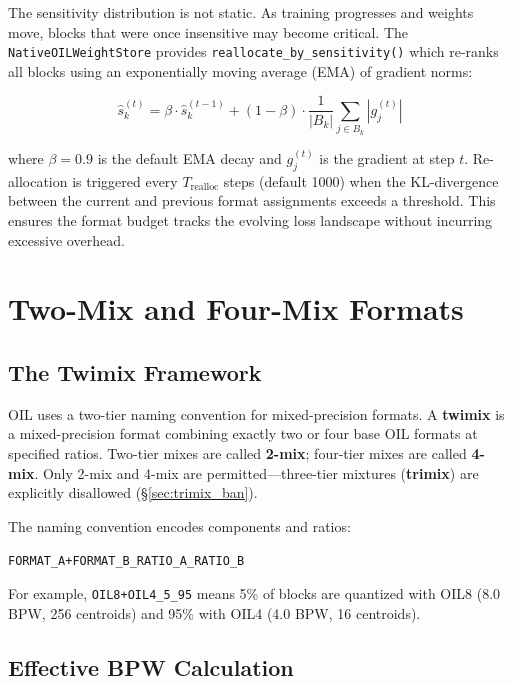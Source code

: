The sensitivity distribution is not static.  As training progresses and
weights move, blocks that were once insensitive may become critical.
The \texttt{NativeOILWeightStore} provides
\texttt{reallocate\_by\_sensitivity()} which re-ranks all blocks using
an exponentially moving average (EMA) of gradient norms:

\begin{equation}
\hat{s}_k^{(t)} = \beta \cdot \hat{s}_k^{(t-1)} + (1 - \beta) \cdot
  \frac{1}{|B_k|} \sum_{j \in B_k} |g_j^{(t)}|
\label{eq:ema_sensitivity}
\end{equation}

\noindent where $\beta = 0.9$ is the default EMA decay and
$g_j^{(t)}$ is the gradient at step $t$.  Re-allocation is triggered
every $T_{\text{realloc}}$ steps (default 1000) when the KL-divergence
between the current and previous format assignments exceeds a threshold.
This ensures the format budget tracks the evolving loss landscape without
incurring excessive overhead.

\section{Two-Mix and Four-Mix Formats}
\label{sec:twimix}

\subsection{The Twimix Framework}

OIL uses a two-tier naming convention for mixed-precision formats.  A
\textbf{twimix} is a mixed-precision format combining exactly two or four
base OIL formats at specified ratios.  Two-tier mixes are called
\textbf{2-mix}; four-tier mixes are called \textbf{4-mix}.  Only 2-mix
and 4-mix are permitted---three-tier mixtures (\textbf{trimix}) are
explicitly disallowed (\S\ref{sec:trimix_ban}).

The naming convention encodes components and ratios:

\begin{center}
\texttt{FORMAT\_A+FORMAT\_B\_RATIO\_A\_RATIO\_B}
\end{center}

\noindent For example, \texttt{OIL8+OIL4\_5\_95} means 5\% of blocks
are quantized with OIL8 (8.0 BPW, 256 centroids) and 95\% with OIL4
(4.0 BPW, 16 centroids).

\subsection{Effective BPW Calculation}

